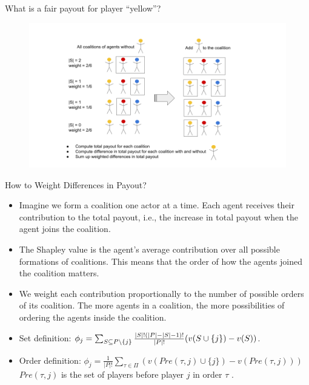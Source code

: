 \documentclass[11pt,compress,t,notes=noshow, aspectratio=169, xcolor=table]{beamer}
\begin{document}
\begin{vbframe}{What is a fair payout for player \enquote{yellow}?}

\begin{figure}
    \centering
    \includegraphics{figure/Shapley_4.png}
\end{figure}

\end{vbframe}

\begin{vbframe}{How to Weight Differences in Payout?}

\begin{itemize}
    \itemsep2em
    \item  Imagine we form a coalition one actor at a time. Each agent receives their contribution to the total payout, i.e., the increase in total payout when the agent joins the coalition.
    \item The Shapley value is the agent's average contribution over all possible formations of coalitions. This means that the order of how the agents joined the coalition matters.
    \item We weight each contribution proportionally to the number of possible orders of its coalition. The more agents in a coalition, the more possibilities of ordering the agents inside the coalition.
    \item Set definition: $\phi_j = \sum_{\SsubPnoj} \frac{|S|!(|P| - |S| - 1)!}{|P|!}(v(\Scupj) - v(S))$.
    \item Order definition: $\phi_j = \frac{1}{|P|!} \sum_{\tau \in \Pi} (v(Pre(\tau,j) \cup \{j\}) - v(Pre(\tau,j)))$
    \\
    $Pre(\tau,j)$ is the set of players before player $j$ in order $\tau$ .
\end{itemize}

\end{vbframe}
\end{document}
